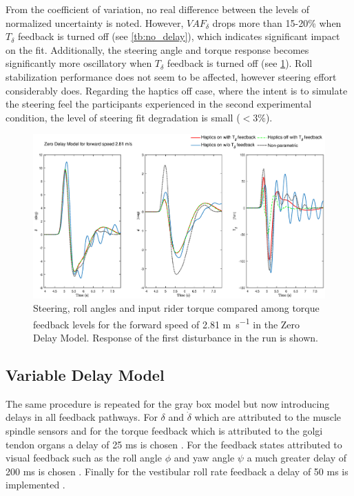 From the coefficient of variation, no real difference between the levels of normalized uncertainty is noted. However, \ensuremath{\mathit{VAF}_\delta} drops more than 15-20\% when \ensuremath{T_\delta} feedback is turned off (see \cref{tb:no_delay}), which indicates significant impact on the fit. Additionally,  the steering angle and torque response   becomes significantly more oscillatory when \ensuremath{{T_\delta}} feedback is turned off (see \cref{fig:paper6}). Roll stabilization performance does not seem to be affected, however steering effort considerably does. Regarding the haptics off case, where the intent is to simulate the steering feel the participants experienced in the second experimental condition, the level of steering fit degradation is small (\ensuremath{<3\%}).

\begin{figure}[!h]
    \centering
    \captionsetup{justification=centering,margin=2cm}

    \includegraphics[width=\textwidth]{images/fb_compare_plots/no_delay_fb_compare28.eps}
    \caption{Steering, roll angles and input rider torque compared among torque feedback levels  for the forward speed of 2.81 \si{\meter\per\second} in the Zero Delay Model. Response of the first disturbance in the run is shown.}
    \label{fig:paper6}
\end{figure}



\subsection{Variable Delay Model}
The same procedure is repeated for the gray box model but now introducing  delays in all feedback pathways. For \ensuremath{\delta} and \ensuremath{\dot{\delta}} which are attributed to the muscle spindle sensors and for the torque feedback which is attributed to the golgi tendon organs  a delay of 25 \si{\milli\second} is chosen \cite{van2002identification,de2002adaptation}. For the feedback states attributed to visual feedback such as the roll angle \ensuremath{\phi} and yaw angle \ensuremath{\psi} a much greater delay of 200 \si{\milli\second} is chosen \cite{kawakami2002visual}. Finally for  the vestibular roll rate feedback a delay of 50 \si{\milli\second} is implemented \cite{barnett2013vestibular}. 

